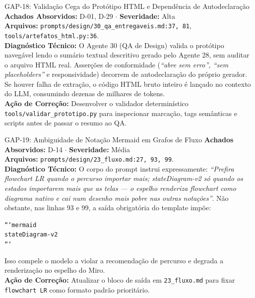 \documentclass[11pt,a4paper]{article}
\begin{document}
\begin{gapbox}{GAP-18: Validação Cega do Protótipo HTML e Dependência de Autodeclaração}
\textbf{Achados Absorvidos:} D-01, D-29 $\cdot$ \textbf{Severidade:} Alta\\
\textbf{Arquivos:} \texttt{prompts/design/30\_qa\_entregaveis.md:37, 81}, \texttt{tools/artefatos\_html.py:36}.\\
\textbf{Diagnóstico Técnico:} O Agente 30 (QA de Design) valida o protótipo navegável lendo o sumário textual descritivo gerado pelo Agente 28, sem auditar o arquivo HTML real. Asserções de conformidade (\textit{``abre sem erro'', ``sem placeholders''} e responsividade) decorrem de autodeclaração do próprio gerador. Se houver falha de extração, o código HTML bruto inteiro é lançado no contexto do LLM, consumindo dezenas de milhares de tokens.\\
\textbf{Ação de Correção:} Desenvolver o validador determinístico \texttt{tools/validar\_prototipo.py} para inspecionar marcação, tags semânticas e scripts antes de passar o resumo ao QA.
\end{gapbox}

\begin{gapbox}{GAP-19: Ambiguidade de Notação Mermaid em Grafos de Fluxo}
\textbf{Achados Absorvidos:} D-14 $\cdot$ \textbf{Severidade:} Média\\
\textbf{Arquivos:} \texttt{prompts/design/23\_fluxo.md:27, 93, 99}.\\
\textbf{Diagnóstico Técnico:} O corpo do prompt instrui expressamente: \textit{``Prefira flowchart LR quando o percurso importar mais; stateDiagram-v2 só quando os estados importarem mais que as telas --- o espelho renderiza flowchart como diagrama nativo e cai num desenho mais pobre nas outras notações''}. Não obstante, nas linhas 93 e 99, a saída obrigatória do template impõe:
\begin{center}
\texttt{```mermaid} \\
\texttt{stateDiagram-v2} \\
\texttt{```}
\end{center}
Isso compele o modelo a violar a recomendação de percurso e degrada a renderização no espelho do Miro.\\
\textbf{Ação de Correção:} Atualizar o bloco de saída em \texttt{23\_fluxo.md} para fixar \texttt{flowchart LR} como formato padrão prioritário.
\end{gapbox}
\end{document}
